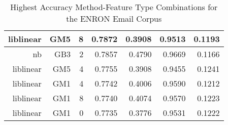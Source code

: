\begin{table}[htbp!]
\begin{center}
\begin{tabular}{ | r | r | r | r | r | r | r | }
			liblinear & GM5 & 8 & 0.7872 & 0.3908 & 0.9513 & 0.1193\\ \hline 
			nb & GB3 & 2 & 0.7857 & 0.4790 & 0.9669 & 0.1166\\ \hline 
			liblinear & GM5 & 4 & 0.7755 & 0.3908 & 0.9455 & 0.1241\\ \hline 
			liblinear & GM1 & 4 & 0.7742 & 0.4006 & 0.9590 & 0.1212\\ \hline 
			liblinear & GM1 & 8 & 0.7740 & 0.4074 & 0.9570 & 0.1223\\ \hline 
			liblinear & GM1 & 0 & 0.7735 & 0.3776 & 0.9531 & 0.1222\\ \hline 

			\end{tabular}
		\caption{Highest Accuracy Method-Feature Type Combinations for the ENRON Email Corpus}
		\label{tab:enron-accuracy-filtered-ranked}
		\end{center}
	\end{table}
	

